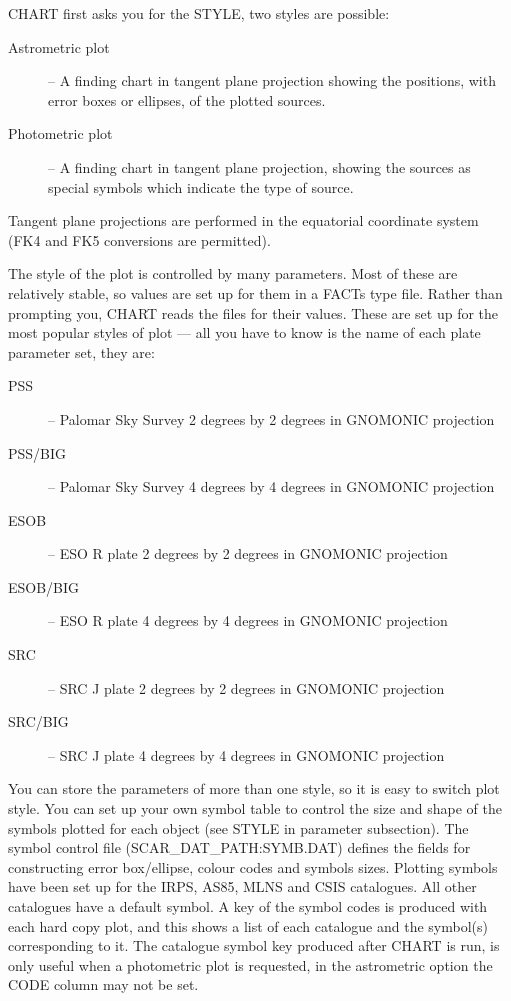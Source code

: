 CHART first asks you for the STYLE, two styles are possible:
\begin{description}
\item [Astrometric plot] -- A finding chart in tangent plane projection showing
the positions, with error boxes or ellipses, of the plotted sources.
\item [Photometric plot] -- A finding chart in tangent plane projection, showing
the sources as special symbols which indicate the type of source.
\end{description}
Tangent plane projections are performed in the equatorial coordinate system
(FK4 and FK5 conversions are permitted).

The style of the plot is controlled by many parameters.
Most of these are relatively stable, so values are set up for them in a FACTs
type file.
Rather than prompting you, CHART reads the files for their values.
These are set up for the most popular styles of plot --- all you have to know
is the name of each plate parameter set, they are:
\begin{description}
\begin{description}
\item [PSS] -- Palomar Sky Survey 2 degrees by 2 degrees in GNOMONIC projection
\item [PSS/BIG] -- Palomar Sky Survey 4 degrees by 4 degrees in GNOMONIC
  projection
\item [ESOB] -- ESO R plate 2 degrees by 2 degrees in GNOMONIC projection
\item [ESOB/BIG] -- ESO R plate 4 degrees by 4 degrees in GNOMONIC projection
\item [SRC] -- SRC J plate 2 degrees by 2 degrees in GNOMONIC projection
\item [SRC/BIG] -- SRC J plate 4 degrees by 4 degrees in GNOMONIC projection
\end{description}
\end{description}
You can store the parameters of more than one style, so it is easy to switch
plot style.
You can set up your own symbol table to control the size and shape of the
symbols plotted for each object (see STYLE in parameter subsection).
The symbol control file (SCAR\_DAT\_PATH:SYMB.DAT) defines the fields for
constructing error box/ellipse, colour codes and symbols sizes.
Plotting symbols have been set up for the IRPS, AS85, MLNS and CSIS
catalogues.
All other catalogues have a default symbol.
A key of the symbol codes is produced with each hard copy plot, and this shows
a list of each catalogue and the symbol(s) corresponding to it.
The catalogue symbol key produced after CHART is run, is only useful when a
photometric plot is requested, in the astrometric option the CODE
column may not be set.

